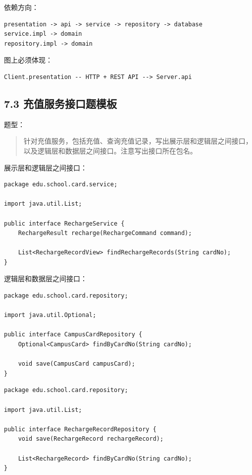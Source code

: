 \documentclass[UTF8,zihao=-4]{ctexart}
\begin{document}
依赖方向：

\small
\begin{verbatim}
presentation -> api -> service -> repository -> database
service.impl -> domain
repository.impl -> domain
\end{verbatim}
\normalsize

图上必须体现：

\small
\begin{verbatim}
Client.presentation -- HTTP + REST API --> Server.api
\end{verbatim}
\normalsize

\subsection{7.3 充值服务接口题模板}

题型：

\begin{quote}
针对充值服务，包括充值、查询充值记录，写出展示层和逻辑层之间接口，以及逻辑层和数据层之间接口。注意写出接口所在包名。
\end{quote}

展示层和逻辑层之间接口：

\small
\begin{verbatim}
package edu.school.card.service;

import java.util.List;

public interface RechargeService {
    RechargeResult recharge(RechargeCommand command);

    List<RechargeRecordView> findRechargeRecords(String cardNo);
}
\end{verbatim}
\normalsize

逻辑层和数据层之间接口：

\small
\begin{verbatim}
package edu.school.card.repository;

import java.util.Optional;

public interface CampusCardRepository {
    Optional<CampusCard> findByCardNo(String cardNo);

    void save(CampusCard campusCard);
}
\end{verbatim}
\normalsize

\small
\begin{verbatim}
package edu.school.card.repository;

import java.util.List;

public interface RechargeRecordRepository {
    void save(RechargeRecord rechargeRecord);

    List<RechargeRecord> findByCardNo(String cardNo);
}
\end{verbatim}
\normalsize
\end{document}
